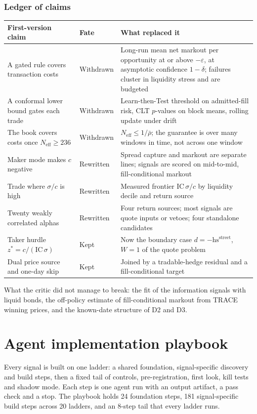 \documentclass[11pt,letterpaper]{article}
\newcommand{\hs}{\mathrm{hs}}             %
\newcommand{\Neff}{N_{\mathrm{eff}}}
\begin{document}
\section{Ledger of claims}
\begin{center}
\begin{tabularx}{\textwidth}{@{}p{} l X@{}}
\toprule
First-version claim & Fate & What replaced it \\
\midrule
A gated rule covers transaction costs & Withdrawn & Long-run mean net markout per opportunity at or above $-\varepsilon$, at asymptotic confidence $1-\delta$; failures cluster in liquidity stress and are budgeted \\
A conformal lower bound gates each trade & Withdrawn & Learn-then-Test threshold on admitted-fill risk, CLT $p$-values on block means, rolling update under drift \\
The book covers costs once $\Neff\ge236$ & Withdrawn & $\Neff\le1/\bar\rho$; the guarantee is over many windows in time, not across one window \\
Maker mode makes $c$ negative & Rewritten & Spread capture and markout are separate lines; signals are scored on mid-to-mid, fill-conditional markout \\
Trade where $\sigma/c$ is high & Rewritten & Measured frontier $\mathrm{IC}\,\sigma/c$ by liquidity decile and return source \\
Twenty weakly correlated alphas & Rewritten & Four return sources; most signals are quote inputs or vetoes; four standalone candidates \\
Taker hurdle $z^{*}=c/(\mathrm{IC}\,\sigma)$ & Kept & Now the boundary case $d=-\hs^{\mathrm{street}}$, $W=1$ of the quote problem \\
Dual price source and one-day skip & Kept & Joined by a tradable-hedge residual and a fill-conditional target \\
\bottomrule
\end{tabularx}
\end{center}

What the critic did not manage to break: the fit of the information signals with liquid bonds, the off-policy estimate of fill-conditional markout from TRACE winning prices, and the known-date structure of D2 and D3.
\part{Agent implementation playbook}
\label{part:playbook}

Every signal is built on one ladder: a shared foundation, signal-specific discovery and build steps, then a fixed tail of controls, pre-registration, first look, kill tests and shadow mode. Each step is one agent run with an output artifact, a pass check and a stop. The playbook holds 24 foundation steps, 181 signal-specific build steps across 20 ladders, and an 8-step tail that every ladder runs.
\end{document}
